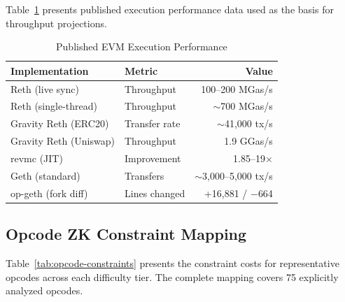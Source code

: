 Table~\ref{tab:evm-benchmarks} presents published execution performance data
used as the basis for throughput projections.

\begin{table}[htbp]
\caption{Published EVM Execution Performance}
\label{tab:evm-benchmarks}
\centering
\begin{tabular}{llr}
\toprule
\textbf{Implementation} & \textbf{Metric} & \textbf{Value} \\
\midrule
Reth (live sync) & Throughput & 100--200 MGas/s \\
Reth (single-thread) & Throughput & ${\sim}$700 MGas/s \\
Gravity Reth (ERC20) & Transfer rate & ${\sim}$41{,}000 tx/s \\
Gravity Reth (Uniswap) & Throughput & 1.9 GGas/s \\
revmc (JIT) & Improvement & 1.85--19$\times$ \\
Geth (standard) & Transfers & ${\sim}$3{,}000--5{,}000 tx/s \\
op-geth (fork diff) & Lines changed & +16{,}881 / $-$664 \\
\bottomrule
\end{tabular}
\end{table}

\subsection{Opcode ZK Constraint Mapping}

Table~\ref{tab:opcode-constraints} presents the constraint costs for
representative opcodes across each difficulty tier. The complete mapping
covers 75 explicitly analyzed opcodes.

